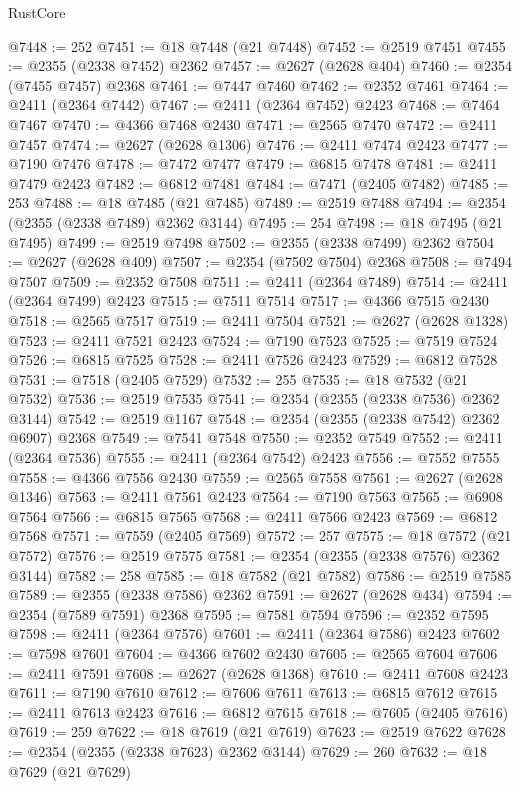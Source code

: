 \begin{lexlean}{RustCore}
\begin{coremodule}
@7448 := 252
@7451 := @18 @7448 (@21 @7448)
@7452 := @2519 @7451
@7455 := @2355 (@2338 @7452) @2362
@7457 := @2627 (@2628 @404)
@7460 := @2354 (@7455 @7457) @2368
@7461 := @7447 @7460
@7462 := @2352 @7461
@7464 := @2411 (@2364 @7442)
@7467 := @2411 (@2364 @7452) @2423
@7468 := @7464 @7467
@7470 := @4366 @7468 @2430
@7471 := @2565 @7470
@7472 := @2411 @7457
@7474 := @2627 (@2628 @1306)
@7476 := @2411 @7474 @2423
@7477 := @7190 @7476
@7478 := @7472 @7477
@7479 := @6815 @7478
@7481 := @2411 @7479 @2423
@7482 := @6812 @7481
@7484 := @7471 (@2405 @7482)
@7485 := 253
@7488 := @18 @7485 (@21 @7485)
@7489 := @2519 @7488
@7494 := @2354 (@2355 (@2338 @7489) @2362 @3144)
@7495 := 254
@7498 := @18 @7495 (@21 @7495)
@7499 := @2519 @7498
@7502 := @2355 (@2338 @7499) @2362
@7504 := @2627 (@2628 @409)
@7507 := @2354 (@7502 @7504) @2368
@7508 := @7494 @7507
@7509 := @2352 @7508
@7511 := @2411 (@2364 @7489)
@7514 := @2411 (@2364 @7499) @2423
@7515 := @7511 @7514
@7517 := @4366 @7515 @2430
@7518 := @2565 @7517
@7519 := @2411 @7504
@7521 := @2627 (@2628 @1328)
@7523 := @2411 @7521 @2423
@7524 := @7190 @7523
@7525 := @7519 @7524
@7526 := @6815 @7525
@7528 := @2411 @7526 @2423
@7529 := @6812 @7528
@7531 := @7518 (@2405 @7529)
@7532 := 255
@7535 := @18 @7532 (@21 @7532)
@7536 := @2519 @7535
@7541 := @2354 (@2355 (@2338 @7536) @2362 @3144)
@7542 := @2519 @1167
@7548 := @2354 (@2355 (@2338 @7542) @2362 @6907) @2368
@7549 := @7541 @7548
@7550 := @2352 @7549
@7552 := @2411 (@2364 @7536)
@7555 := @2411 (@2364 @7542) @2423
@7556 := @7552 @7555
@7558 := @4366 @7556 @2430
@7559 := @2565 @7558
@7561 := @2627 (@2628 @1346)
@7563 := @2411 @7561 @2423
@7564 := @7190 @7563
@7565 := @6908 @7564
@7566 := @6815 @7565
@7568 := @2411 @7566 @2423
@7569 := @6812 @7568
@7571 := @7559 (@2405 @7569)
@7572 := 257
@7575 := @18 @7572 (@21 @7572)
@7576 := @2519 @7575
@7581 := @2354 (@2355 (@2338 @7576) @2362 @3144)
@7582 := 258
@7585 := @18 @7582 (@21 @7582)
@7586 := @2519 @7585
@7589 := @2355 (@2338 @7586) @2362
@7591 := @2627 (@2628 @434)
@7594 := @2354 (@7589 @7591) @2368
@7595 := @7581 @7594
@7596 := @2352 @7595
@7598 := @2411 (@2364 @7576)
@7601 := @2411 (@2364 @7586) @2423
@7602 := @7598 @7601
@7604 := @4366 @7602 @2430
@7605 := @2565 @7604
@7606 := @2411 @7591
@7608 := @2627 (@2628 @1368)
@7610 := @2411 @7608 @2423
@7611 := @7190 @7610
@7612 := @7606 @7611
@7613 := @6815 @7612
@7615 := @2411 @7613 @2423
@7616 := @6812 @7615
@7618 := @7605 (@2405 @7616)
@7619 := 259
@7622 := @18 @7619 (@21 @7619)
@7623 := @2519 @7622
@7628 := @2354 (@2355 (@2338 @7623) @2362 @3144)
@7629 := 260
@7632 := @18 @7629 (@21 @7629)

\end{coremodule}
\end{lexlean}
